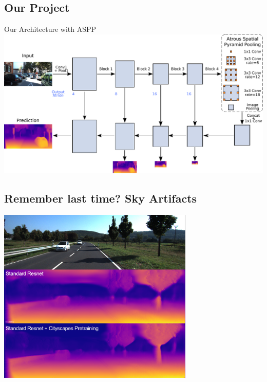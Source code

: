 \documentclass[11pt]{beamer}
\begin{document}
\subsection{Our Project}
\begin{frame}[c]{Our Architecture with ASPP}
  \centering
  \includegraphics[width=1.0\textwidth]{figures/architecture/architecture.pdf}
\end{frame}


\subsection{Remember last time? Sky Artifacts}
\label{sec:orgcd1d83a}
\begin{frame}[c]{\subsecname}
  \centering
  \includegraphics[width=0.7\textwidth]{figures/images/implementationcomparison_004.png}
\end{frame}
\end{document}
